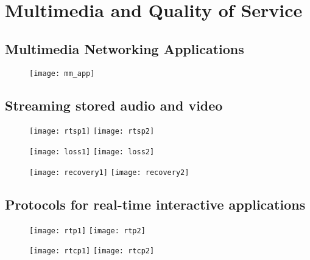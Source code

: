 \section{Multimedia and Quality of Service}

\subsection{Multimedia Networking Applications}

\begin{figure}[H]
  \centering
  \texttt{[image: mm\_app]}
\end{figure}

\subsection{Streaming stored audio and video}

\begin{figure}[H]
  \centering
  \texttt{[image: rtsp1]}
  \texttt{[image: rtsp2]}
\end{figure}

\begin{figure}[H]
  \centering
  \texttt{[image: loss1]}
  \texttt{[image: loss2]}
\end{figure}

\begin{figure}[H]
  \centering
  \texttt{[image: recovery1]}
  \texttt{[image: recovery2]}
\end{figure}

\subsection{Protocols for real-time interactive applications}

\begin{figure}[H]
  \centering
  \texttt{[image: rtp1]}
  \texttt{[image: rtp2]}
\end{figure}

\begin{figure}[H]
  \centering
  \texttt{[image: rtcp1]}
  \texttt{[image: rtcp2]}
\end{figure}


